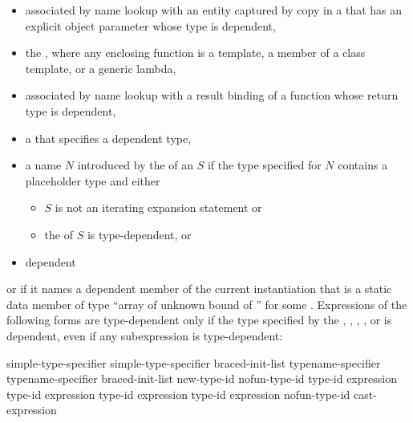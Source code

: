 \begin{itemize}
\begin{example}
\begin{codeblock}
int main() {
  f<int>();
}
\end{codeblock}
\end{example}
\item
associated by name lookup with
an entity captured by copy
in a 
that has an explicit object parameter whose type is dependent,
\item
the
, where any enclosing function is a
template, a member of a class template, or a generic lambda,
\item
associated by name lookup
with a result binding of a function
whose return type is dependent,
\item
a  that specifies a dependent type,
\item
a name $N$ introduced by the 
of an  $S$
if the type specified for $N$ contains a placeholder type and either
\begin{itemize}
\item $S$ is not an iterating expansion statement or
\item the  of $S$ is type-dependent, or
\end{itemize}
\item
dependent
\end{itemize}
or if it names a dependent member of the current instantiation that is a static
data member of type
``array of unknown bound of '' for some .
Expressions of the following forms are type-dependent only if the type
specified by the
,
,
,
,
or
is dependent, even if any subexpression is type-dependent:

\begin{ncsimplebnf}
simple-type-specifier \terminal{(}  \terminal{)}\br
simple-type-specifier braced-init-list\br
typename-specifier \terminal{(}  \terminal{)}\br
typename-specifier braced-init-list\br
\opt{\terminal{::}}   new-type-id \br
\opt{\terminal{::}}   \terminal{(} nofun-type-id \terminal{)} \br
{} \terminal{<} type-id \terminal{>} \terminal{(} expression \terminal{)}\br
{} \terminal{<} type-id \terminal{>} \terminal{(} expression \terminal{)}\br
{} \terminal{<} type-id \terminal{>} \terminal{(} expression \terminal{)}\br
{} \terminal{<} type-id \terminal{>} \terminal{(} expression \terminal{)}\br
\terminal{(} nofun-type-id \terminal{)} cast-expression
\end{ncsimplebnf}

